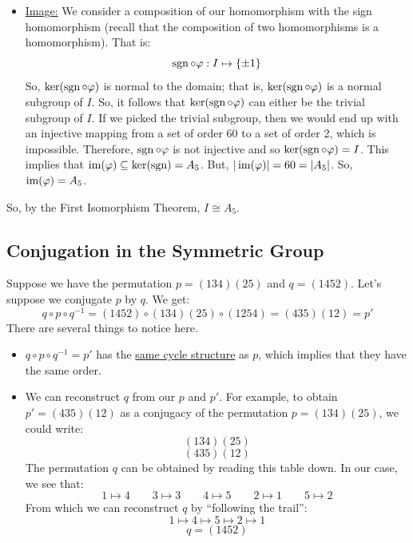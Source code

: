 \documentclass[letterpaper]{article}
\begin{document}
\begin{mdframed}
\begin{itemize}
        \item \underline{Image:} We consider a composition of our homomorphism with the sign homomorphism (recall that the composition of two homomorphisms is a homomorphism). That is: 
        \[\operatorname{sgn} \circ \varphi: I \mapsto \{\pm 1\}\]
        So, $\ker(\operatorname{sgn} \circ \varphi)$ is normal to the domain; that is, $\ker(\operatorname{sgn} \circ \varphi)$ is a normal subgroup of $I$. So, it follows that $\ker(\operatorname{sgn} \circ \varphi)$ can either be the trivial subgroup of $I$. If we picked the trivial subgroup, then we would end up with an injective mapping from a set of order 60 to a set of order 2, which is impossible. Therefore, $\operatorname{sgn} \circ \varphi$ is not injective and so $\ker(\operatorname{sgn} \circ \varphi) = I$. This implies that $\operatorname{im}(\varphi) \subseteq \ker(\operatorname{sgn}) = A_5$. But, $|\operatorname{im}(\varphi)| = 60 = |A_5|$. So, $\operatorname{im}(\varphi) = A_5$. 
    \end{itemize}
    So, by the First Isomorphism Theorem, $I \cong A_5$. 
\end{mdframed}


\subsection{Conjugation in the Symmetric Group}
Suppose we have the permutation $p = (134)(25)$ and $q = (1452)$. Let's suppose we conjugate $p$ by $q$. We get: 
\[q \circ p \circ q^{-1} = (1452) \circ (134)(25) \circ (1254) = (435)(12) = p'\]
There are several things to notice here. 
\begin{itemize}
    \item $q \circ p \circ q^{-1} = p'$ has the \underline{same cycle structure} as $p$, which implies that they have the same order. 
    \item We can reconstruct $q$ from our $p$ and $p'$. For example, to obtain $p' = (435)(12)$ as a conjugacy of the permutation $p = (134)(25)$, we could write: 
    \[(134)(25)\]
    \[(435)(12)\]
    The permutation $q$ can be obtained by reading this table down. In our case, we see that:
    \[1 \mapsto 4 \qquad 3 \mapsto 3 \qquad 4 \mapsto 5 \qquad 2 \mapsto 1 \qquad 5 \mapsto 2\]
    From which we can reconstruct $q$ by ``following the trail'':
    \[1 \mapsto 4 \mapsto 5 \mapsto 2 \mapsto 1\]
    \[q = (1452)\]
\end{itemize}
\end{document}
